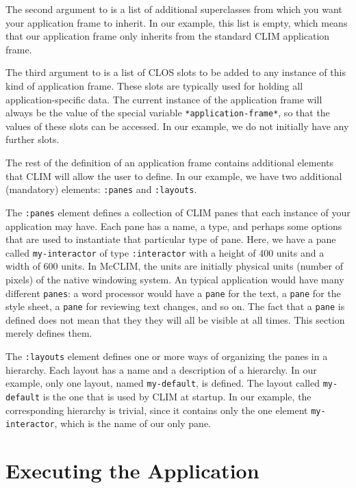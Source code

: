 The second argument to  is a list of
additional superclasses from which you want your application frame to
inherit.  In our example, this list is empty, which means that our
application frame only inherits from the standard CLIM application
frame.

The third argument to  is a list of
CLOS slots to be added to any instance of this kind of application
frame.  These slots are typically used for holding all
application-specific data.  The current instance of the application
frame will always be the value of the special variable
\texttt{*application-frame*}, so that the values of these slots can be
accessed.  In our example, we do not initially have any further slots.

The rest of the definition of an application frame contains additional
elements that CLIM will allow the user to define.  In our example, we
have two additional (mandatory) elements: \texttt{:panes} and
\texttt{:layouts}.

The \texttt{:panes} element defines a collection of CLIM panes that
each instance of your application may have.  Each pane has a name, a
type, and perhaps some options that are used to instantiate that
particular type of pane.  Here, we have a pane called
\texttt{my-interactor} of type \texttt{:interactor} with a height of
400 units and a width of 600 units.  In McCLIM, the units are
initially physical units (number of pixels) of the native windowing
system. An typical application would have many different
\texttt{panes}: a word processor would have a \texttt{pane} for the
text, a \texttt{pane} for the style sheet, a \texttt{pane} for
reviewing text changes, and so on. The fact that a \texttt{pane} is
defined does not mean that they they will all be visible at all
times. This section merely defines them.

The \texttt{:layouts} element defines one or more ways of organizing
the panes in a hierarchy.  Each layout has a name and a description of
a hierarchy.  In our example, only one layout, named
\texttt{my-default}, is defined.  The layout called \texttt{my-default}
is the one that is used by CLIM at startup.  In our example, the
corresponding hierarchy is trivial, since it contains only the one
element \texttt{my-interactor}, which is the name of our only pane.

\section{Executing the Application}

